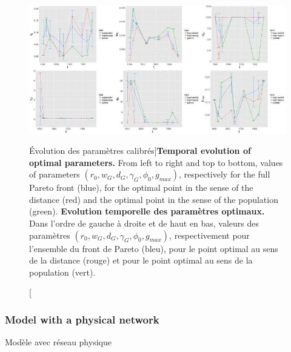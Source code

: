 \begin{figure}
	\includegraphics[width=\linewidth]{Figures/Final/6-2-3-fig-macrocoevol-parameters.jpg}
	\caption[Evolution of calibrated parameters][Évolution des paramètres calibrés]{\textbf{Temporal evolution of optimal parameters.} From left to right and top to bottom, values of parameters $(r_0,w_G,d_G,\gamma_G,\phi_0,g_{max})$, respectively for the full Pareto front (blue), for the optimal point in the sense of the distance (red) and the optimal point in the sense of the population (green). \label{fig:macrocoevol:parameters}}{\textbf{Evolution temporelle des paramètres optimaux.} Dans l'ordre de gauche à droite et de haut en bas, valeurs des paramètres $(r_0,w_G,d_G,\gamma_G,\phi_0,g_{max})$, respectivement pour l'ensemble du front de Pareto (bleu), pour le point optimal au sens de la distance (rouge) et pour le point optimal au sens de la population (vert).\label{fig:macrocoevol:parameters}}
\end{figure}








\subsubsection{Model with a physical network}{Modèle avec réseau physique}


